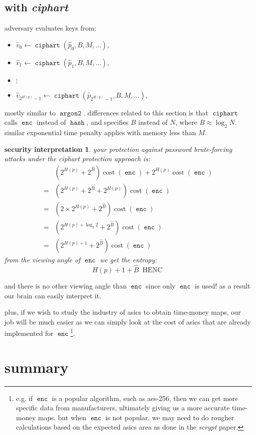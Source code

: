 \documentclass[twocolumn]{article}
\newtheorem{security}{security interpretation}
\DeclareMathOperator{\enc}{\mathtt{enc}}
\DeclareMathOperator{\hash}{\mathtt{hash}}
\DeclareMathOperator{\argon}{\mathtt{argon2}}
\DeclareMathOperator{\ciphart}{\mathtt{ciphart}}
\DeclareMathOperator{\cost}{cost}
\DeclareMathOperator{\henc}{\; HENC}
\begin{document}
\subsection{with \emph{ciphart}}
adversary evaluates keys from:
\begin{itemize}
    \item $\hat v_0 \gets \ciphart(\hat p_0, B, M, \ldots)$,
    \item $\hat v_1 \gets \ciphart(\hat p_1, B, M, \ldots)$,
    \item $\vdots$
    \item $\hat v_{2^{H(p)}-1} \gets \ciphart(\hat p_{2^{H(p)}-1}, B, M,
    \ldots)$,
\end{itemize}

mostly similar to $\argon$.  differences related to this section is that
$\ciphart$ calls $\enc$ instead of $\hash$, and specifies $B$ instead of
$N$, where $B \approx \log_2 N$.  similar exponential time penalty applies
with memory less than $M$.

\begin{security}
your protection against password brute-forcing attacks under the
\emph{ciphart} protection approach is:
\begin{align*}
        & \left(2^{H(p)} + 2^{\hat B}\right) \cost(\enc) + 2^{H(p)}
            \cost(\enc) \\
    ={} & \left(2^{H(p)} + 2^{\hat B} + 2^{H(p)}\right) \cost(\enc) \\
    ={} & \left(2\times2^{H(p)} + 2^{\hat B}\right) \cost(\enc) \\
    ={} & \left(2^{H(p) + \log_2 2} + 2^{\hat B}\right) \cost(\enc) \\
    ={} & \left(2^{H(p) + 1} + 2^{\hat B}\right) \cost(\enc)
\end{align*}
from the viewing angle of $\enc$ we get the entropy:
\[
    H(p) + 1 + \hat B \henc
\]
\end{security}

and there is no other viewing angle than $\enc$ since only $\enc$ is used!
as a result our brain can easily interpret it.  

plus, if we wish to study the industry of asics to obtain time-money maps,
our job will be much easier as we can simply look at the cost of asics that
are already implemented for $\enc$\footnote{e.g. if $\enc$ is a popular
algorithm, such as aes-256, then we can get more specific data from
manufacturers, ultimately giving us a more accurate time-money maps.  but
when $\enc$ is not popular, we may need to do rougher calculations based on
the expected asics area as done in the \emph{scrypt} paper.}.

\section{summary}
\end{document}
